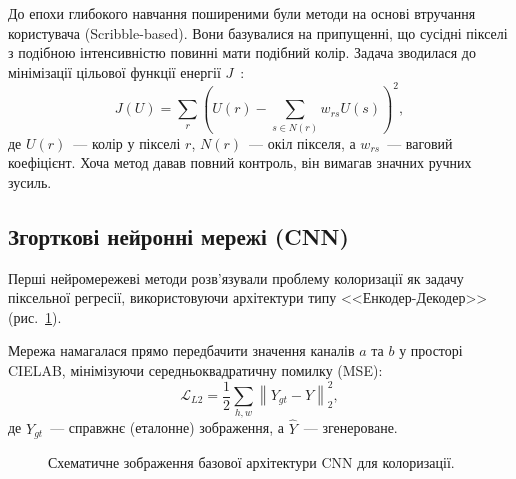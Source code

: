 \documentclass[]{iptconf}
\begin{document}
			До епохи глибокого навчання поширеними були методи на основі втручання користувача (Scribble-based). Вони базувалися на припущенні, що сусідні пікселі з подібною інтенсивністю повинні мати подібний колір. Задача зводилася до мінімізації цільової функції енергії $J$~\cite{2004-colorization-using-optimization}:
			\begin{equation*}
				J(U)=\sum_{r}\left(U(r)-\sum_{s\in N(r)}w_{rs}U(s)\right)^{2},
			\end{equation*}
			де $U(r)$~--- колір у пікселі $r$, $N(r)$~--- окіл пікселя, а $w_{rs}$~--- ваговий коефіцієнт. Хоча метод давав повний контроль, він вимагав значних ручних зусиль.
		
        \subsection{Згорткові нейронні мережі (CNN)}
            
            Перші нейромережеві методи розв'язували проблему колоризації як задачу піксельної регресії, використовуючи архітектури типу <<Енкодер-Декодер>> (рис.~\ref{fig:cnn}).

			Мережа намагалася прямо передбачити значення каналів $a$ та $b$ у просторі CIELAB, мінімізуючи середньоквадратичну помилку (MSE):
            \begin{equation*}
                \mathcal{L}_{L2} = \frac{1}{2} \sum_{h,w} \left\lVert Y_{gt} - \hat{Y}\right\rVert_2^2,
            \end{equation*}
            де $Y_{gt}$~--- справжнє (еталонне) зображення, а $\hat{Y}$~--- згенероване.

            \begin{figure}[h]
                \centering
                \caption{Схематичне зображення базової архітектури CNN для колоризації.}
                \label{fig:cnn}
            \end{figure}
\end{document}

